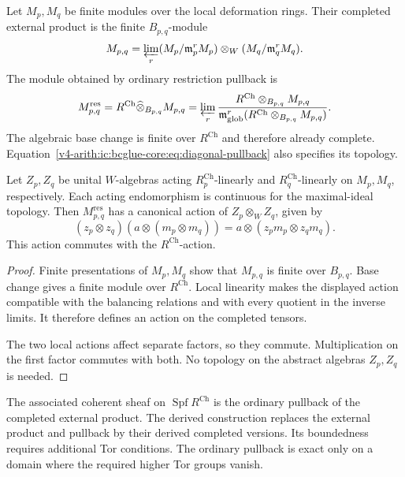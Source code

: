 \begin{definition}
\label{v4-arith:ic:bcglue-core:def:diagonal-pullback}
Let $M_p,M_q$ be finite modules over the local deformation rings.
Their completed external product is the finite $B_{p,q}$-module
\[
 M_{p,q}=\varprojlim_r
 (M_p/\mathfrak m_p^rM_p)\otimes_W
 (M_q/\mathfrak m_q^rM_q).
\]
The module obtained by ordinary restriction pullback is
\begin{equation}
\label{v4-arith:ic:bcglue-core:eq:diagonal-pullback}
 M_{p,q}^{\mathrm{res}}
 =R^{\mathrm{Ch}}\widehat\otimes_{B_{p,q}}M_{p,q}
 =\varprojlim_r
 \frac{R^{\mathrm{Ch}}\otimes_{B_{p,q}}M_{p,q}}
 {\mathfrak m_{\mathrm{glob}}^r
       (R^{\mathrm{Ch}}\otimes_{B_{p,q}}M_{p,q})}.
\end{equation}
The algebraic base change is finite over $R^{\mathrm{Ch}}$ and
therefore already complete. Equation~\eqref{v4-arith:ic:bcglue-core:eq:diagonal-pullback}
also specifies its topology.
\end{definition}

\begin{proposition}
\label{v4-arith:ic:bcglue-core:def:bernstein-product-action}
\label{v4-arith:ic:bcglue-core:prop:formal-pullback-action}
Let $Z_p,Z_q$ be unital $W$-algebras acting
$R_p^{\mathrm{Ch}}$-linearly and $R_q^{\mathrm{Ch}}$-linearly on
$M_p,M_q$, respectively. Each acting endomorphism is continuous
for the maximal-ideal topology. Then $M_{p,q}^{\mathrm{res}}$ has
a canonical action of $Z_p\otimes_W Z_q$, given by
\[
 (z_p\otimes z_q)(a\otimes(m_p\otimes m_q))
   =a\otimes(z_pm_p\otimes z_qm_q).
\]
This action commutes with the $R^{\mathrm{Ch}}$-action.
\end{proposition}

\begin{proof}
Finite presentations of $M_p,M_q$ show that $M_{p,q}$ is finite
over $B_{p,q}$. Base change gives a finite module over
$R^{\mathrm{Ch}}$. Local linearity makes the displayed action
compatible with the balancing relations and with every quotient
in the inverse limits. It therefore defines an action on the
completed tensors.

The two local actions affect separate factors,
so they commute. Multiplication on the first factor commutes with
both. No topology on the abstract algebras $Z_p,Z_q$ is needed.
\end{proof}

The associated coherent sheaf on $\operatorname{Spf}R^{\mathrm{Ch}}$
is the ordinary pullback of the completed external product.
The derived construction replaces the external product and pullback
by their derived completed versions. Its boundedness requires
additional Tor conditions. The ordinary pullback is exact only on
a domain where the required higher Tor groups vanish.

